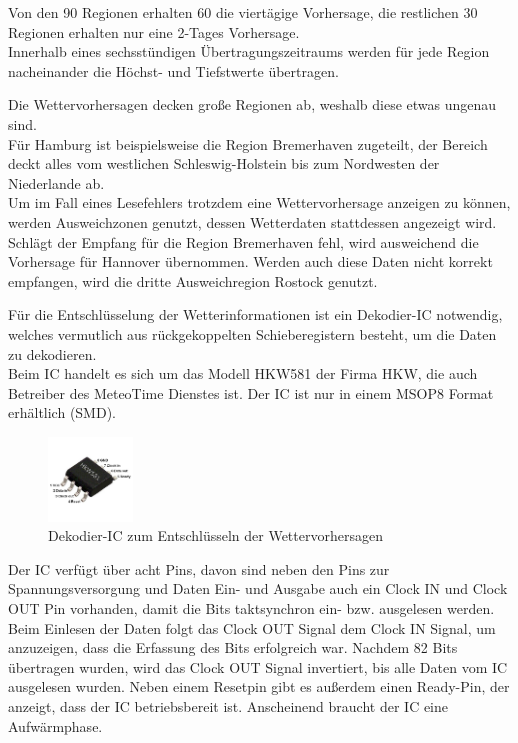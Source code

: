 \documentclass[a4paper,11pt]{article}
\begin{document}
\vspace{0.2cm}
\noindent
Von den 90 Regionen erhalten 60 die viertägige Vorhersage, die restlichen 30 Regionen erhalten nur eine 2-Tages Vorhersage. \\
Innerhalb eines sechsstündigen Übertragungszeitraums werden für jede Region nacheinander die Höchst- und Tiefstwerte übertragen.

\noindent
Die Wettervorhersagen decken große Regionen ab, weshalb diese etwas ungenau sind. \\
Für Hamburg ist beispielsweise die Region Bremerhaven zugeteilt, der Bereich deckt alles vom westlichen Schleswig-Holstein bis zum Nordwesten der Niederlande ab. \\
Um im Fall eines Lesefehlers trotzdem eine Wettervorhersage anzeigen zu können, werden Ausweichzonen genutzt, dessen Wetterdaten stattdessen angezeigt wird. Schlägt
der Empfang für die Region Bremerhaven fehl, wird ausweichend die Vorhersage für Hannover übernommen. Werden auch diese Daten nicht korrekt empfangen, wird die dritte
Ausweichregion Rostock genutzt. 

\vspace{0.3cm}
\noindent
Für die Entschlüsselung der Wetterinformationen ist ein Dekodier-IC notwendig, welches vermutlich aus rückgekoppelten Schieberegistern besteht, um die Daten zu dekodieren. \\
Beim IC handelt es sich um das Modell HKW581 der Firma HKW, die auch Betreiber des MeteoTime Dienstes ist. Der IC ist nur in einem MSOP8 Format erhältlich (SMD).

\begin{figure}[H]
  \centering
  \includegraphics[width = 0.2\textwidth]{HKW5811}
  \caption{Dekodier-IC zum Entschlüsseln der Wettervorhersagen}
  \label{fig:hkw581}
\end{figure}

\noindent
Der IC verfügt über acht Pins, davon sind neben den Pins zur Spannungsversorgung und Daten Ein- und Ausgabe auch ein Clock IN und Clock OUT Pin vorhanden, damit die Bits
taktsynchron ein- bzw. ausgelesen werden. Beim Einlesen der Daten folgt das Clock OUT Signal dem Clock IN Signal, um anzuzeigen, dass die Erfassung des Bits erfolgreich war. 
Nachdem 82 Bits übertragen wurden, wird das Clock OUT Signal invertiert, bis alle Daten vom IC ausgelesen wurden. 
Neben einem Resetpin gibt es außerdem einen Ready-Pin, der anzeigt, dass der IC betriebsbereit ist. Anscheinend braucht der IC eine Aufwärmphase. 
\end{document}
